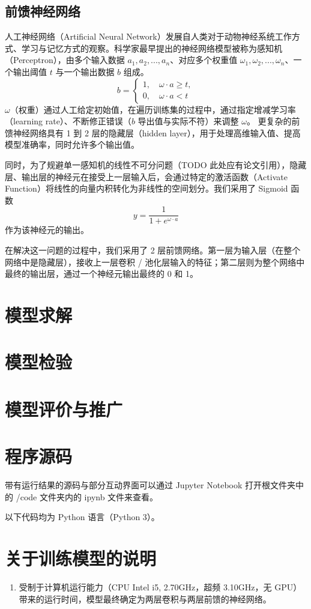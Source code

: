 \documentclass[UTF8]{ctexart}
\begin{document}
\subsection{前馈神经网络}
人工神经网络（Artificial Neural Network）发展自人类对于动物神经系统工作方式、学习与记忆方式的观察。科学家最早提出的神经网络模型被称为感知机（Perceptron），由多个输入数据 $a_1, a_2, ..., a_n$、对应多个权重值 $\omega_1, \omega_2, ..., \omega_n$、一个输出阈值 $t$ 与一个输出数据 $b$ 组成。
$$
b = 
\left\{
\begin{aligned}
1, \quad \omega \cdot a \geqslant t,\\
0, \quad \omega \cdot a < t
\end{aligned}
\right.
$$
$\omega$（权重）通过人工给定初始值，在遍历训练集的过程中，通过指定增减学习率（learning rate）、不断修正错误（$b$ 导出值与实际不符）来调整 $\omega$。
更复杂的前馈神经网络具有 1 到 2 层的隐藏层（hidden layer），用于处理高维输入值、提高模型准确率，同时允许多个输出值。

同时，为了规避单一感知机的线性不可分问题（TODO 此处应有论文引用），隐藏层、输出层的神经元在接受上一层输入后，会通过特定的激活函数（Activate Function）将线性的向量内积转化为非线性的空间划分。我们采用了 Sigmoid 函数
$$y = \frac{1}{1 + e^{\omega \cdot a}}$$
作为该神经元的输出。

在解决这一问题的过程中，我们采用了 2 层前馈网络。第一层为输入层（在整个网络中是隐藏层），接收上一层卷积 / 池化层输入的特征；第二层则为整个网络中最终的输出层，通过一个神经元输出最终的 0 和 1。

\section{模型求解}


\section{模型检验}

\section{模型评价与推广}

\clearpage
\appendix
\appendixname
\section{程序源码}
带有运行结果的源码与部分互动界面可以通过 Jupyter Notebook 打开根文件夹中的 /code 文件夹内的 ipynb 文件来查看。

以下代码均为 Python 语言（Python 3）。

\section{关于训练模型的说明}
\begin{enumerate}
\item 受制于计算机运行能力（CPU Intel i5, 2.70GHz，超频 3.10GHz，无 GPU）带来的运行时间，模型最终确定为两层卷积与两层前馈的神经网络。
\end{enumerate}
\end{document}
